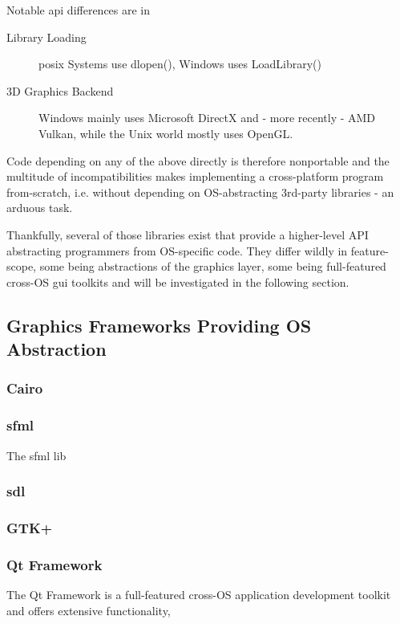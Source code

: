 Notable \gls{api} differences are in
\begin{description}
	\item[Library Loading] \gls{posix} Systems use dlopen(), Windows uses LoadLibrary()
	\item[3D Graphics Backend] Windows mainly uses Microsoft DirectX and - more recently - AMD Vulkan, while the Unix world mostly uses OpenGL.
\end{description}

Code depending on any of the above directly is therefore nonportable and the multitude of incompatibilities makes implementing a cross-platform program from-scratch, i.e. without depending on OS-abstracting 3rd-party libraries - an arduous task.

Thankfully, several of those libraries exist that provide a higher-level API abstracting programmers from OS-specific code. They differ wildly in feature-scope, some being abstractions of the graphics layer, some being full-featured cross-OS \gls{gui} toolkits and will be investigated in the following section.

\subsection{Graphics Frameworks Providing OS Abstraction}

\subsubsection{Cairo}

\subsubsection{\gls{sfml}}
The \gls{sfml} lib

\subsubsection{\gls{sdl}}

\subsubsection{GTK+}
\subsubsection{Qt Framework}

The Qt Framework is a full-featured cross-OS application development toolkit and offers extensive functionality, 

